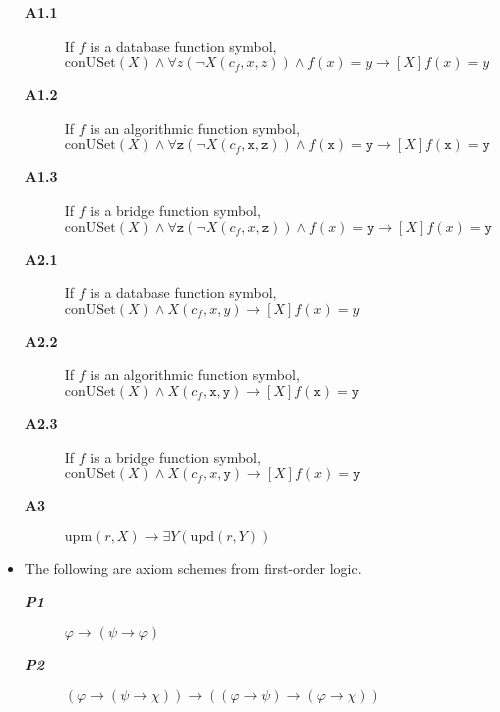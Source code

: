 \documentclass[preprint,11pt]{elsarticle}
\theoremstyle{definition}
\theoremstyle{remark}
\begin{document}
\begin{itemize}
\begin{description}

  \item[\textbf{A1.1}] If $f$ is a database function symbol, \\
$\mathrm{conUSet}(X) \wedge \forall z (\neg X(c_f,x,z)) \wedge f(x)=y \rightarrow [X]f(x) = y$  \smallskip

  \item[\textbf{A1.2}] If $f$ is an algorithmic function symbol, \\
$\mathrm{conUSet}(X) \wedge \forall \mathtt{z} (\neg X(c_f,\mathtt{x},\mathtt{z})) \wedge f(\mathtt{x})=\mathtt{y} \rightarrow [X]f(\mathtt{x}) = \mathtt{y}$  \smallskip

  \item[\textbf{A1.3}] If $f$ is a bridge function symbol, \\
$\mathrm{conUSet}(X) \wedge \forall \mathtt{z} (\neg X(c_f,x,\mathtt{z})) \wedge f(x)=\mathtt{y} \rightarrow [X]f(x) = \mathtt{y}$  \smallskip

  \item[\textbf{A2.1}] If $f$ is a database function symbol, \\
$\mathrm{conUSet}(X) \wedge X(c_f,x,y) \rightarrow [X]f(x)=y$\smallskip

  \item[\textbf{A2.2}] If $f$ is an algorithmic function symbol, \\
$\mathrm{conUSet}(X) \wedge X(c_f,\mathtt{x},\mathtt{y}) \rightarrow [X]f(\mathtt{x})=\mathtt{y}$\smallskip

  \item[\textbf{A2.3}] If $f$ is a bridge function symbol, \\
$\mathrm{conUSet}(X) \wedge X(c_f,x,\mathtt{y}) \rightarrow [X]f(x)=\mathtt{y}$\smallskip



  \item[\textbf{A3}] $\mathrm{upm}(r,X) \rightarrow \exists  Y (\mathrm{upd}(r,Y))$  \smallskip

\end{description}


\item The following are axiom schemes from first-order logic.

\begin{description}
\item[\textbf{\emph{P1}}] $\varphi\rightarrow(\psi\rightarrow\varphi)$\smallskip

\item[\textbf{\emph{P2}}] $(\varphi\rightarrow(\psi\rightarrow\chi))\rightarrow((\varphi\rightarrow\psi)\rightarrow (\varphi\rightarrow\chi))$\smallskip


\end{description}
\end{itemize}
\end{document}
